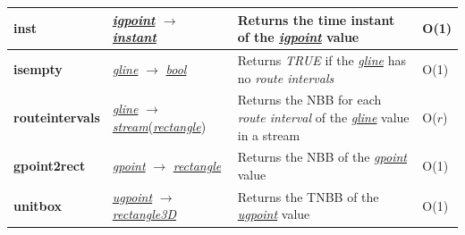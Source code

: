 \documentclass[a4paper]{article}
\newcommand{\op}[1]{\textbf{#1}}
\newcommand{\dt}[1]{\textsl{\underline{#1}}}
\newcommand{\true}{\textsl{TRUE}}
\begin{document}
\begin{table}
\begin{center}
\begin{tabularx}{1.0\textwidth}{|l|l|X|X|}
  \hline
  \op{inst}           & \dt{igpoint} $\rightarrow$ \dt{instant} & Returns the time instant of the \dt{igpoint} value & O(1)\\
  \hline
  \op{isempty}        & \dt{gline} $\rightarrow$ \dt{bool}      & Returns \true{} if the \dt{gline} has no \textit{route intervals} &  O(1)\\
  \hline
  \op{routeintervals} & \dt{gline} $\rightarrow$ \dt{stream}(\dt{rectangle}) & Returns the NBB for each \textit{route interval} of the \dt{gline} value in a stream & O($r$)\\
  \hline
  \op{gpoint2rect}    & \dt{gpoint} $\rightarrow$ \dt{rectangle} & Returns the NBB of the \dt{gpoint} value       & O(1)\\
\hline
  \op{unitbox}        & \dt{ugpoint} $\rightarrow$ \dt{rectangle3D} & Returns the TNBB of the \dt{ugpoint} value  & O(1)\\
  \hline
  \end{tabularx}
  \end{center}
\end{table}
\end{document}
